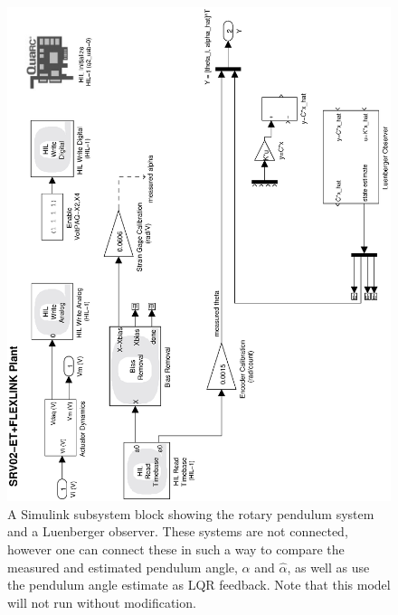 \begin{figure}[htb!]
    \centering
    \includegraphics[width=0.6\linewidth,angle=-90]{eps/lab_4/lqr_observer_model}
    \caption{A Simulink subsystem block showing the rotary pendulum system and a Luenberger observer. These systems are not connected, however one can connect these in such a way to compare the measured and estimated pendulum angle, $\alpha$ and $\hat{\alpha}$, as well as use the pendulum angle estimate as LQR feedback. Note that this model will not run without modification.}
    \label{figure:lab4_lqr_observer_model}
\end{figure}
\newpage
